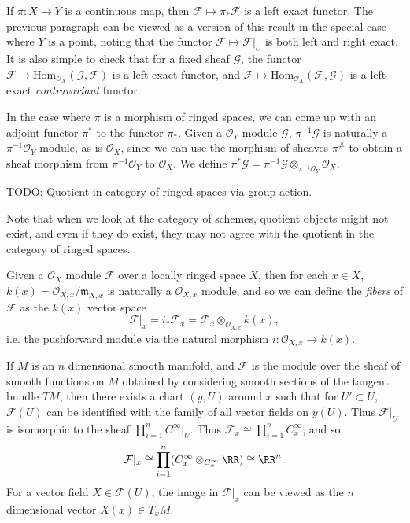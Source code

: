 If $\pi: X \to Y$ is a continuous map, then $\mathcal{F} \mapsto \pi_* \mathcal{F}$ is a left exact functor. The previous paragraph can be viewed as a version of this result in the special case where $Y$ is a point, noting that the functor $\mathcal{F} \mapsto \mathcal{F}|_U$ is both left and right exact. It is also simple to check that for a fixed sheaf $\mathcal{G}$, the functor $\mathcal{F} \mapsto \text{Hom}_{\mathcal{O}_X}(\mathcal{G},\mathcal{F})$ is a left exact functor, and $\mathcal{F} \mapsto \text{Hom}_{\mathcal{O}_X}(\mathcal{F},\mathcal{G})$ is a left exact \emph{contravariant} functor.

In the case where $\pi$ is a morphism of ringed spaces, we can come up with an adjoint functor $\pi^*$ to the functor $\pi_*$. Given a $\mathcal{O}_Y$ module $\mathcal{G}$, $\pi^{-1} \mathcal{G}$ is naturally a $\pi^{-1} \mathcal{O}_Y$ module, as is $\mathcal{O}_X$, since we can use the morphism of sheaves $\pi^\#$ to obtain a sheaf morphism from $\pi^{-1} \mathcal{O}_Y$ to $\mathcal{O}_X$. We define $\pi^* \mathcal{G} = \pi^{-1} \mathcal{G} \otimes_{\pi^{-1} \mathcal{O}_Y} \mathcal{O}_X$.

\begin{example}
    TODO: Quotient in category of ringed spaces via group action.
\end{example}

Note that when we look at the category of schemes, quotient objects might not exist, and even if they do exist, they may not agree with the quotient in the category of ringed spaces.

Given a $\mathcal{O}_X$ module $\mathcal{F}$ over a locally ringed space $X$, then for each $x \in X$, $k(x) = \mathcal{O}_{X,x} / \mathfrak{m}_{X,x}$ is naturally a $\mathcal{O}_{X,x}$ module, and so we can define the \emph{fibers} of $\mathcal{F}$ as the $k(x)$ vector space
%
\[ \mathcal{F}|_x = i_* \mathcal{F}_x = \mathcal{F}_x \otimes_{\mathcal{O}_{X,x}} k(x), \]
%
i.e. the pushforward module via the natural morphism $i: \mathcal{O}_{X,x} \to k(x)$.

\begin{example}
    If $M$ is an $n$ dimensional smooth manifold, and $\mathcal{F}$ is the module over the sheaf of smooth functions on $M$ obtained by considering smooth sections of the tangent bundle $TM$, then there exists a chart $(y,U)$ around $x$ such that for $U' \subset U$, $\mathcal{F}(U)$ can be identified with the family of all vector fields on $y(U)$. Thus $\mathcal{F}|_U$ is isomorphic to the sheaf $\prod_{i = 1}^n C^\infty|_U$. Thus $\mathcal{F}_x \cong \prod_{i = 1}^n C^\infty_x$, and so
    \[ \mathcal{F}|_x \cong \prod_{i = 1}^n (C^\infty_x \otimes_{C^\infty_x} \RR) \cong \RR^n. \]
    For a vector field $X \in \mathcal{F}(U)$, the image in $\mathcal{F}|_x$ can be viewed as the $n$ dimensional vector $X(x) \in T_x M$.
\end{example}

